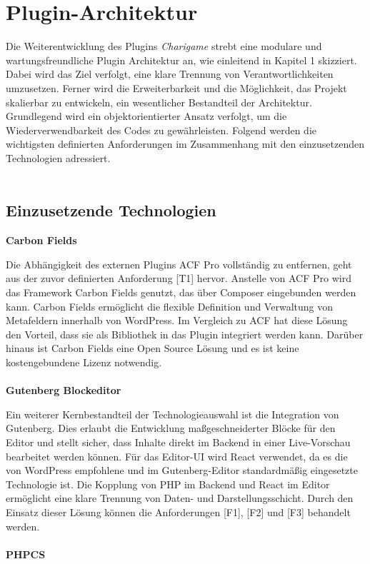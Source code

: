 \section{Plugin-Architektur}
Die Weiterentwicklung des Plugins \emph{Charigame} strebt eine modulare und wartungsfreundliche Plugin Architektur an, wie einleitend in Kapitel 1 skizziert. %
Dabei wird das Ziel verfolgt, eine klare Trennung von Verantwortlichkeiten umzusetzen.
Ferner wird die Erweiterbarkeit und die Möglichkeit, das Projekt skalierbar zu entwickeln, ein wesentlicher Bestandteil der Architektur.
Grundlegend wird ein objektorientierter Ansatz verfolgt, um die Wiederverwendbarkeit des Codes zu gewährleisten.
Folgend werden die wichtigsten definierten Anforderungen im Zusammenhang mit den einzusetzenden Technologien adressiert.
\\\\
\subsection{Einzusetzende Technologien}
\textbf{Carbon Fields}

Die Abhängigkeit des externen Plugins ACF Pro vollständig zu entfernen, geht aus der zuvor definierten Anforderung [T1] hervor.
Anstelle von ACF Pro wird das Framework Carbon Fields genutzt, das über Composer eingebunden werden kann.
Carbon Fields ermöglicht die flexible Definition und Verwaltung von Metafeldern innerhalb von WordPress.
Im Vergleich zu ACF hat diese Lösung den Vorteil, dass sie als Bibliothek in das Plugin integriert werden kann.
Darüber hinaus ist Carbon Fields eine Open Source Lösung und es ist keine kostengebundene Lizenz notwendig.
\\\\
\textbf{Gutenberg Blockeditor}

Ein weiterer Kernbestandteil der Technologieauswahl ist die Integration von Gutenberg.
Dies erlaubt die Entwicklung maßgeschneiderter Blöcke für den Editor und stellt sicher, dass Inhalte direkt im Backend in einer Live-Vorschau bearbeitet werden können.
Für das Editor-UI wird React verwendet, da es die von WordPress empfohlene und im Gutenberg-Editor standardmäßig eingesetzte Technologie ist.
Die Kopplung von PHP im Backend und React im Editor ermöglicht eine klare Trennung von Daten- und Darstellungsschicht.
Durch den Einsatz dieser Lösung können die Anforderungen [F1], [F2] und [F3] behandelt werden.
\\\\
\textbf{PHPCS}

